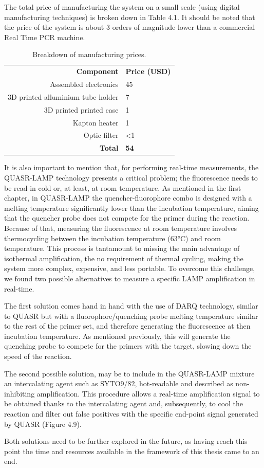 The total price of manufacturing the system on a small scale (using digital manufacturing techniques) is broken down in Table 4.1. It should be noted that the price of the system is about 3 orders of magnitude lower than a commercial Real Time PCR machine.

\begin{table}[]
\centering
\begin{tabular}{rl}
\textbf{Component}    & \textbf{Price (USD)} \\
Assembled electronics & 45                   \\
3D printed alluminium tube holder           & 7                    \\
3D printed printed case      & 1                    \\
Kapton heater         & 1                    \\
Optic filter          & \textless{}1         \\
\textbf{Total}        & \textbf{54}         
\end{tabular}
\caption{Breakdown of manufacturing prices.}
\end{table}


It is also important to mention that, for performing real-time measurements, the QUASR-LAMP technology presents a critical problem; the fluorescence needs to be read in cold or, at least, at room temperature. As mentioned in the first chapter, in QUASR-LAMP the quencher-fluorophore combo is designed with a melting temperature significantly lower than the incubation temperature, aiming that the quencher probe does not compete for the primer during the reaction. Because of that, measuring the fluorescence at room temperature involves thermocycling between the incubation temperature (63°C) and room temperature. This process is tantamount to missing the main advantage of isothermal amplification, the no requirement of thermal cycling, making the system more complex, expensive, and less portable. To overcome this challenge, we found two possible alternatives to measure a specific LAMP amplification in real-time.

The first solution comes hand in hand with the use of DARQ technology, similar to QUASR but with a fluorophore/quenching probe melting temperature similar to the rest of the primer set, and therefore generating the fluorescence at then incubation temperature. As mentioned previously, this will generate the quenching probe to compete for the primers with the target, slowing down the speed of the reaction.

The second possible solution, may be to include in the QUASR-LAMP mixture an intercalating agent such as SYTO9/82, hot-readable and described as non-inhibiting amplification\cite{oscorbin_comparison_2016}. This procedure allows a real-time amplification signal to be obtained thanks to the intercalating agent and, subsequently, to cool the reaction and filter out false positives with the specific end-point signal generated by QUASR (Figure 4.9). 

Both solutions need to be further explored in the future, as having reach this point the time and resources available in the framework  of this thesis came to an end.
